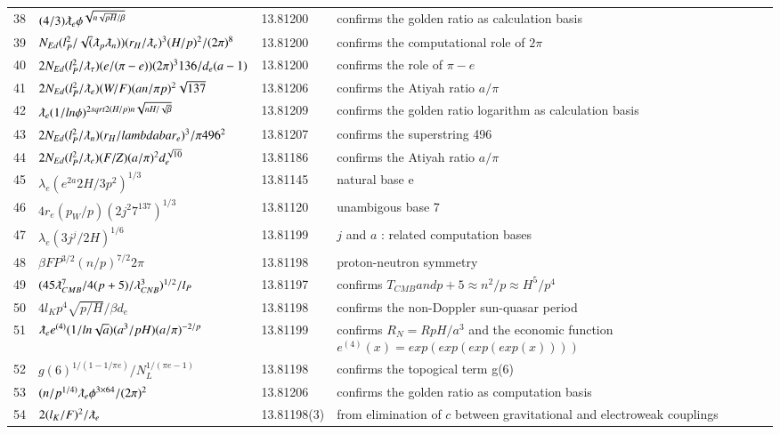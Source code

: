 \documentclass[a4paper,9pt]{article}
\begin{document}
\begin{appendix}
\begin{table}
\begin{tabular}{llll}
  38 & $ (4/3)\lambdabar_e \phi^{\sqrt {n\sqrt{pH}/\beta}} $ & 13.81200 & confirms the golden ratio as calculation basis \\ 
   39 & $N_{Ed}(l_P^2/\sqrt(\lambdabar_p \lambdabar_n)) (r_H/\lambdabar_e)^3 (H/p)^2 / (2\pi)^8  $ & 13.81200 & confirms the computational role of $2\pi$\\ 
   40 & $2N_{Ed}(l_P^2/\lambdabar_{\tau}) (e/(\pi-e)) (2\pi)^3 136/d_e(a-1) $ & 13.81200 & confirms the role of $\pi - e$\\
    41 & $2N_{Ed}(l_P^2/\lambdabar_e) (W/F) (an/\pi p)^2 \sqrt{137} $ & 13.81206 & confirms the Atiyah ratio $a/\pi$\\
    42 & $ \lambdabar_e (1/ln\phi)^{2sqrt {2(H/p)n\sqrt{nH/\sqrt\beta}}} $ & 13.81209 & confirms the golden ratio logarithm as calculation basis \\ 
   43 & $2N_{Ed}(l_P^2/\lambdabar_n) (r_H/lambdabar_e)^3/ \pi 496^2 $ & 13.81207 & confirms the superstring 496\\ 
   44 & $2N_{Ed}(l_P^2/\lambdabar_e) (F/Z) (a/\pi)^2 d_e^{\sqrt{10}} $ & 13.81186 & confirms the Atiyah ratio $a/\pi$\\ 
   45 & $\lambda_{e} (e^{2a}2H/3p^2)^{1/3}$ & 13.81145 & natural base e\\
   46 & $4r_e (p_W/p) (2j^2 7^{137})^{1/3} $ & 13.81120 & unambigous base 7 \\
   47 & $\lambda_{e} (3j^j/2H)^{1/6}$ & 13.81199 & $j$ and $a$ : related computation bases \\
   48 & $\beta F P^{3/2} (n/p)^{7/2} 2 \pi$ & 13.81198 & proton-neutron symmetry  \\ 
   49 & $(45\lambdabar_{CMB}^7/4(p+5)/\lambda_{CNB}^3)^{1/2}/l_P$ & 13.81197 & confirms $T_{CMB} and p+5 \approx n^2/p \approx H^5/p^4$\\
   50 & $4l_Kp^4 \sqrt{p/H}/\beta d_e$ & 13.81198 & confirms the non-Doppler sun-quasar period \\
   51 & $\lambdabar_{e} e^{(4)}(1/ln{\sqrt a}) (a^3/pH) (a/\pi)^{-2/p}   $ & 13.81199 & confirms $R_N = R pH/a^3$ and the economic function $e^{(4)}(x)= exp(exp(exp(exp(x))))$\\
   52 & $g(6)^{1/(1-1/\pi e)}/N_L^{1/(\pi e-1)}$ & 13.81198 & confirms the topogical term g(6) \\
    53 & $(n/p^{1/4)}  \lambdabar_{e} \phi ^{3\times 64}/(2\pi)^2   $ & 13.81206 & confirms the golden ratio as computation basis \\
   54 & $2(l_K/F)^2/\lambdabar_{e}$ & 13.81198(3) & from elimination of $c$ between gravitational and electroweak couplings \\
  

\end{tabular}
\end{table}
\end{appendix}
\end{document}
